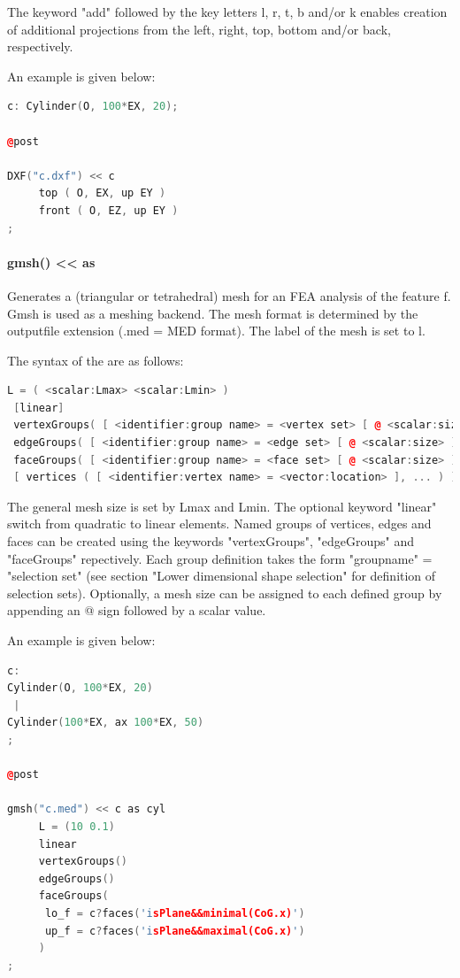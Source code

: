 The keyword "add" followed by the key letters l, r, t, b and/or k
enables creation of additional projections from the left, right, top,
bottom and/or back, respectively.

An example is given below:

\begin{lstlisting}[language=c++]
c: Cylinder(O, 100*EX, 20);

@post

DXF("c.dxf") << c
     top ( O, EX, up EY )
     front ( O, EZ, up EY )
;
\end{lstlisting}


\paragraph{gmsh() \textless\textless { } as  }

Generates a (triangular or tetrahedral) mesh for an FEA analysis of the
feature f. Gmsh is used as a meshing backend. The mesh format is
determined by the outputfile extension (.med = MED format). The label of
the mesh is set to l.

The syntax of the  are as follows:

\begin{lstlisting}[language=c++]
L = ( <scalar:Lmax> <scalar:Lmin> )  
 [linear]  
 vertexGroups( [ <identifier:group name> = <vertex set> [ @ <scalar:size> ], ... ] )  
 edgeGroups( [ <identifier:group name> = <edge set> [ @ <scalar:size> ], ... ] )  
 faceGroups( [ <identifier:group name> = <face set> [ @ <scalar:size> ], ... ] )  
 [ vertices ( [ <identifier:vertex name> = <vector:location> ], ... ) ]
\end{lstlisting}
  

The general mesh size is set by Lmax and Lmin. The optional keyword
"linear" switch from quadratic to linear elements. Named groups of
vertices, edges and faces can be created using the keywords
"vertexGroups", "edgeGroups" and "faceGroups" repectively. Each group
definition takes the form "groupname" = "selection set" (see section
"Lower dimensional shape selection" for definition of selection sets). Optionally, a mesh
size can be assigned to each defined group by appending an @ sign
followed by a scalar value.

An example is given below:

\begin{lstlisting}[language=c++]
c:
Cylinder(O, 100*EX, 20)
 |
Cylinder(100*EX, ax 100*EX, 50)
;

@post

gmsh("c.med") << c as cyl
     L = (10 0.1)
     linear
     vertexGroups()
     edgeGroups()
     faceGroups(
      lo_f = c?faces('isPlane&&minimal(CoG.x)')
      up_f = c?faces('isPlane&&maximal(CoG.x)')
     )
;
\end{lstlisting}


